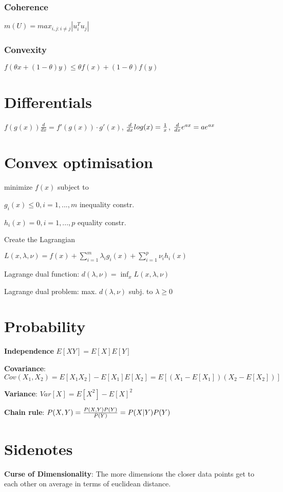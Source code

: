 \documentclass[a4paper,11pt,twocolumn]{article}
\begin{document}
\subsubsection{Coherence}

$m(U)= max_{i,j:i\neq j} | u_i^T u_j|$

\subsubsection{Convexity}

$f(\theta x + (1-\theta)y) \leq \theta f(x) + (1-\theta) f(y)$

\section{Differentials}

$ f(g(x)) \frac{d}{dx} = f'(g(x)) \cdot g'(x)$, $ {d \over {dx}} log(x) = {1 \over x}$, $ {d \over {dx}} e^{ax} = ae^{ax}$



\section{Convex optimisation}

minimize $f(x)$ subject to 

$g_i(x) \leq 0, i = 1,...,m$ inequality constr.

$h_i(x) = 0, i = 1,...,p$ equality constr.

Create the Lagrangian

$L(x, \lambda, \nu) = f(x) + \sum_{i=1}^m{\lambda_i g_i(x) + \sum_{i=1}^p{\nu_i h_i(x)}}$

Lagrange dual function: $ d(\lambda, \nu) = \inf_{x} L (x,\lambda, \nu) $

Lagrange dual problem: max. $d(\lambda, \nu)$  subj. to $\lambda \geq 0$

\section{Probability}

\textbf{Independence} $E[XY] = E[X] E[Y]$

\textbf{Covariance}: $Cov(X_1, X_2) = E[X_1 X_2] - E[X_1] E[X_2] = E[(X_1 - E[X_1])(X_2-E[X_2])]$

\textbf{Variance}: $Var[X] = E[X^2] - E[X]^2$


\textbf{Chain rule}: $P(X,Y) = {{P(X,Y)P(Y)}\over{P(Y)}} = P(X|Y)P(Y)$

\section{Sidenotes}

\textbf{Curse of Dimensionality}: The more dimensions the closer data points get to each other on average in terms of euclidean distance.
\end{document}
